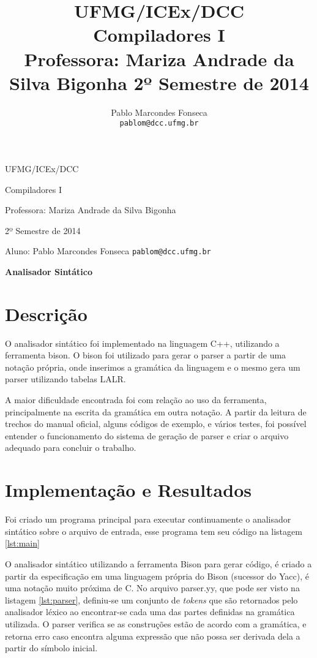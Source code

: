 \documentclass[12pt,a4paper]{article}
\title{\Large UFMG/ICEx/DCC\\
\Large Compiladores I\\
\large Professora: Mariza Andrade da Silva Bigonha
\normalsize 2º Semestre de 2014\\
}
\author{Pablo Marcondes Fonseca\\
\texttt{pablom@dcc.ufmg.br}}
\begin{document}
\centerline{\Large UFMG/ICEx/DCC}
\medskip
\centerline{\Large Compiladores I}
\medskip
\centerline{\large Professora: Mariza Andrade da Silva Bigonha}
\medskip
\centerline{\normalsize 2º Semestre de 2014}
\medskip
\centerline{\large Aluno: Pablo Marcondes Fonseca \texttt{pablom@dcc.ufmg.br}}
\bigskip
\centerline{\Large \textbf{Analisador Sintático}}

\section{Descrição}

O analisador sintático foi implementado na linguagem C++, utilizando a ferramenta bison. O bison foi utilizado para gerar o parser a partir de uma notação própria, onde inserimos a gramática da linguagem e o mesmo gera um parser utilizando tabelas LALR.

A maior dificuldade encontrada foi com relação ao uso da ferramenta, principalmente na escrita da gramática em outra notação. A partir da leitura de trechos do manual oficial, alguns códigos de exemplo, e vários testes, foi possível entender o funcionamento do sistema de geração de parser e criar o arquivo adequado para concluir o trabalho.


\section{Implementação e Resultados}

Foi criado um programa principal para executar continuamente o analisador sintático sobre o arquivo de entrada, esse programa tem seu código na listagem \ref{lst:main}



\medskip
O analisador sintático utilizando a ferramenta Bison para gerar código, é criado a partir da especificação em uma linguagem própria do Bison (sucessor do Yacc), é uma notação muito próxima de C. No arquivo parser.yy, que pode ser visto na listagem \ref{lst:parser}, definiu-se um conjunto de \textit{tokens} que são retornados pelo analisador léxico ao encontrar-se cada uma das partes definidas na gramática utilizada. O parser verifica se as construções estão de acordo com a gramática, e retorna erro caso encontra alguma expressão que não possa ser derivada dela a partir do símbolo inicial.
\end{document}

